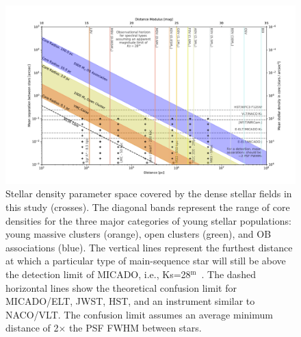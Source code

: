 \documentclass{aa}
\newcommand{\m}{$^\mathrm{m}$~}
\begin{document}
\begin{figure}

    \centering
    \includegraphics[width=\textwidth]{resolved_stellar_densities.pdf}

    \caption{Stellar density parameter space covered by the dense stellar fields in this study (crosses).
    The diagonal bands represent the range of core densities for the three major categories of young stellar populations: young massive clusters (orange), open clusters (green), and OB associations (blue).
    The vertical lines represent the furthest distance at which a particular type of main-sequence star will still be above the detection limit of MICADO, i.e., Ks=28\m.
    The dashed horizontal lines show the theoretical confusion limit for MICADO/ELT, JWST, HST, and an instrument similar to NACO/VLT.
    The confusion limit assumes an average minimum distance of 2$\times$ the PSF FWHM between stars.
    }

    \label{fig:resolved_stellar_densities}

\end{figure}
\end{document}
